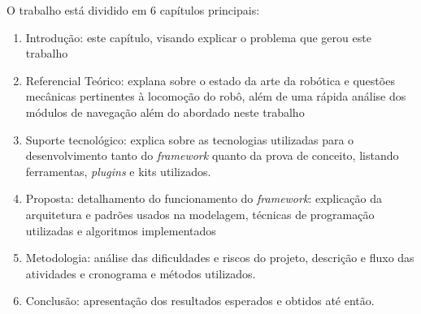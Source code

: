 O trabalho está dividido em 6 capítulos principais:
\begin{enumerate}
	\item Introdução: este capítulo, visando explicar o problema que gerou este trabalho
	\item Referencial Teórico: explana sobre o estado da arte da robótica e questões mecânicas pertinentes à locomoção do robô, além de uma rápida análise dos módulos de navegação além do abordado neste trabalho
	\item Suporte tecnológico: explica sobre as tecnologias utilizadas para o desenvolvimento tanto do \textit{framework} quanto da prova de conceito, listando ferramentas, \textit{plugins} e kits utilizados.	
	\item Proposta: detalhamento do funcionamento do \textit{framework}: explicação da arquitetura e padrões usados na modelagem, técnicas de programação utilizadas e algoritmos implementados
	\item Metodologia: análise das dificuldades e riscos do projeto, descrição e fluxo das atividades e cronograma e métodos utilizados.
	\item Conclusão: apresentação dos resultados esperados e obtidos até então.
\end{enumerate}
